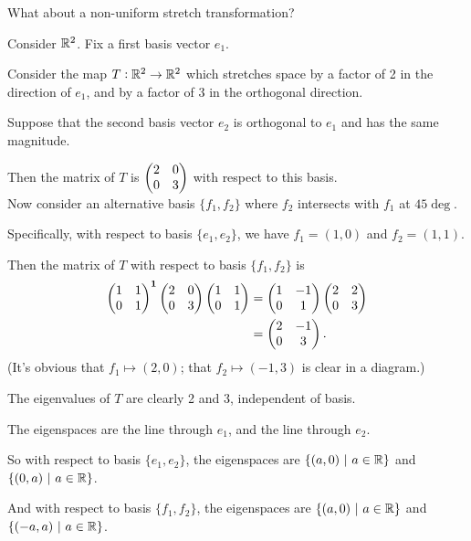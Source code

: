 What about a non-uniform stretch transformation?

\newpage
Consider $\mathbb{R}^2$. Fix a first basis vector $e_1$.

Consider the map $T:\mathbb{R}^2\to\mathbb{R}^2$ which stretches space by a factor of 2 in the
direction of $e_1$, and by a factor of 3 in the orthogonal direction.

Suppose that the second basis vector $e_2$ is orthogonal to $e_1$ and has the
same magnitude.

Then the matrix of $T$ is $\begin{pmatrix}2 & 0\\0 & 3\\ \end{pmatrix}$ with respect to this basis.
~\\

Now consider an alternative basis $\{f_1, f_2\}$ where $f_2$ intersects with
$f_1$ at $45\deg$.

Specifically, with respect to basis $\{e_1, e_2\}$, we have $f_1 = (1, 0)$ and
$f_2 = (1, 1)$.

Then the matrix of $T$ with respect to basis $\{f_1, f_2\}$ is
\begin{align*}
  \begin{pmatrix}1 & 1\\0 & 1\\ \end{pmatrix}^{\mathbf 1} \begin{pmatrix}2 & 0\\0 & 3\\ \end{pmatrix} \begin{pmatrix}1 & 1\\0 & 1\\ \end{pmatrix} &=
  \begin{pmatrix}1 & -1\\0 & 1\\ \end{pmatrix}  \begin{pmatrix}2 & 2\\0 & 3\\ \end{pmatrix} \\ &=
  \begin{pmatrix}2 & -1\\0 & 3\\ \end{pmatrix}.
\end{align*}
(It's obvious that $f_1 \mapsto (2, 0)$; that $f_2 \mapsto (-1, 3)$ is clear in
a diagram.)

The eigenvalues of $T$ are clearly 2 and 3, independent of basis.

The eigenspaces are the line through $e_1$, and the line through $e_2$.

So with respect to basis $\{e_1, e_2\}$, the eigenspaces are
$\{(a, 0) ~|~ a \in \mathbb{R}\}$ and $\{(0, a) ~|~ a \in \mathbb{R}\}$.

And with respect to basis $\{f_1, f_2\}$, the eigenspaces are
$\{(a, 0) ~|~ a \in \mathbb{R}\}$ and $\{(-a, a) ~|~ a \in \mathbb{R}\}$.


